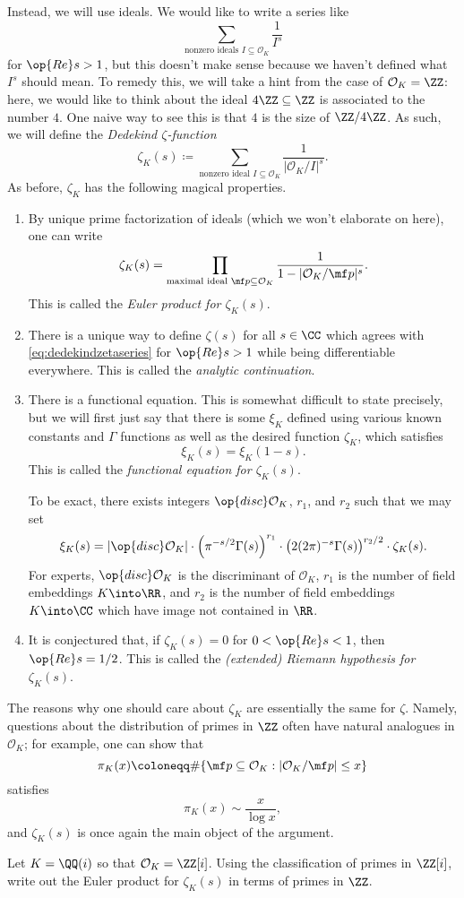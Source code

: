 \documentclass{article}
\begin{document}
Instead, we will use ideals. We would like to write a series like
\[\sum_{\text{nonzero ideals }I\subseteq\mathcal O_K}\frac1{I^s}\]
for $\op{Re}s>1$, but this doesn't make sense because we haven't defined what $I^s$ should mean. To remedy this, we will take a hint from the case of $\mathcal O_K=\ZZ$: here, we would like to think about the ideal $4\ZZ\subseteq\ZZ$ is associated to the number $4$. One naive way to see this is that $4$ is the size of $\ZZ/4\ZZ$. As such, we will define the \textit{Dedekind $\zeta$-function}
\begin{equation}
	\zeta_K(s)\coloneqq\sum_{\text{nonzero ideal }I\subseteq\mathcal O_K}\frac1{|\mathcal O_K/I|^s}. \label{eq:dedekindzetaseries}
\end{equation}
As before, $\zeta_K$ has the following magical properties.
\begin{enumerate}
	\item By unique prime factorization of ideals (which we won't elaborate on here), one can write
	\[\zeta_K(s)=\prod_{\text{maximal ideal }\mf p\subseteq\mathcal O_K}\frac1{1-|\mathcal O_K/\mf p|^s}.\]
	This is called the \textit{Euler product for $\zeta_K(s)$}.
	\item There is a unique way to define $\zeta(s)$ for all $s\in\CC$ which agrees with \autoref{eq:dedekindzetaseries} for $\op{Re}s>1$ while being differentiable everywhere. This is called the \textit{analytic continuation}.
	\item There is a functional equation. This is somewhat difficult to state precisely, but we will first just say that there is some $\xi_K$ defined using various known constants and $\Gamma$ functions as well as the desired function $\zeta_K$, which satisfies
	\[\xi_K(s)=\xi_K(1-s).\]
	This is called the \textit{functional equation for $\zeta_K(s)$}.
	
	To be exact, there exists integers $\op{disc}\mathcal O_K$, $r_1$, and $r_2$ such that we may set
	\[\xi_K(s)=|\op{disc}\mathcal O_K|\cdot\left(\pi^{-s/2}\Gamma(s)\right)^{r_1}\cdot\left(2(2\pi)^{-s}\Gamma(s)\right)^{r_2/2}\cdot\zeta_K(s).\]
	For experts, $\op{disc}\mathcal O_K$ is the discriminant of $\mathcal O_K$, $r_1$ is the number of field embeddings $K\into\RR$, and $r_2$ is the number of field embeddings $K\into\CC$ which have image not contained in $\RR$.
	\item It is conjectured that, if $\zeta_K(s)=0$ for $0<\op{Re}s<1$, then $\op{Re}s=1/2$. This is called the \textit{(extended) Riemann hypothesis for $\zeta_K(s)$}.
\end{enumerate}
The reasons why one should care about $\zeta_K$ are essentially the same for $\zeta$. Namely, questions about the distribution of primes in $\ZZ$ often have natural analogues in $\mathcal O_K$; for example, one can show that
\[\pi_K(x)\coloneqq\#\{\mf p\subseteq\mathcal O_K:|\mathcal O_K/\mf p|\le x\}\]
satisfies
\[\pi_K(x)\sim\frac x{\log x},\]
and $\zeta_K(s)$ is once again the main object of the argument.
\begin{exe}
	Let $K=\QQ(i)$ so that $\mathcal O_K=\ZZ[i]$. Using the classification of primes in $\ZZ[i]$, write out the Euler product for $\zeta_K(s)$ in terms of primes in $\ZZ$.
\end{exe}
\end{document}
